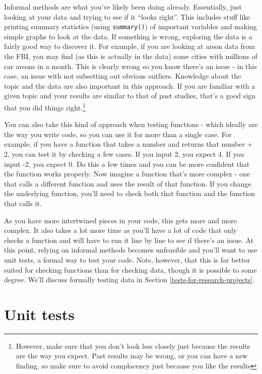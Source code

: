 \documentclass[
]{krantz}
\begin{document}
Informal methods are what you've likely been doing already. Essentially, just looking at your data and trying to see if it ``looks right''. This includes stuff like printing summary statistics (using \texttt{summary()}) of important variables and making simple graphs to look at the data. If something is wrong, exploring the data is a fairly good way to discover it. For example, if you are looking at arson data from the FBI, you may find (as this is actually in the data) some cities with millions of car arsons in a month. This is clearly wrong so you know there's an issue - in this case, an issue with not subsetting out obvious outliers. Knowledge about the topic and the data are also important in this approach. If you are familiar with a given topic and your results are similar to that of past studies, that's a good sign that you did things right.\footnote{However, make sure that you don't look less closely just because the results are the way you expect. Past results may be wrong, or you can have a new finding, so make sure to avoid complacency just because you like the results}

You can also take this kind of approach when testing functions - which ideally are the way you write code, so you can use it for more than a single case. For example, if you have a function that takes a number and returns that number + 2, you can test it by checking a few cases. If you input 2, you expect 4. If you input -2, you expect 0. Do this a few times and you can be more confident that the function works properly. Now imagine a function that's more complex - one that calls a different function and uses the result of that function. If you change the underlying function, you'll need to check both that function and the function that calls it.

As you have more intertwined pieces in your code, this gets more and more complex. It also takes a lot more time as you'll have a lot of code that only checks a function and will have to run it line by line to see if there's an issue. At this point, relying on informal methods becomes unfeasible and you'll want to use unit tests, a formal way to test your code. Note, however, that this is far better suited for checking functions than for checking data, though it is possible to some degree. We'll discuss formally testing data in Section \ref{tests-for-research-projects}.

\hypertarget{unit-tests}{%
\section{Unit tests}\label{unit-tests}}
\end{document}
